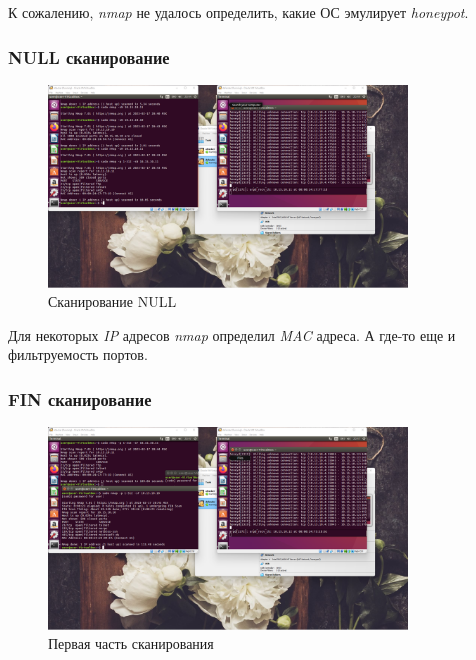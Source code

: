 \documentclass[a4paper]{article}
\begin{document}
  К сожалению, \textit{nmap} не удалось определить, какие ОС эмулирует \textit{honeypot}.

  \subsubsection{NULL сканирование}

  \begin{figure}[H]
    \centering
    \includegraphics[width=0.85\textwidth]{01_00 (37)}
    \caption{Сканирование NULL}
  \end{figure}

  Для некоторых \textit{IP} адресов \textit{nmap} определил \textit{MAC} адреса.
  А где-то еще и фильтруемость портов.

  \subsubsection{FIN сканирование}

  \begin{figure}[H]
    \centering
    \includegraphics[width=0.85\textwidth]{01_00 (38)}
    \caption{Первая часть сканирования}
  \end{figure}
\end{document}

